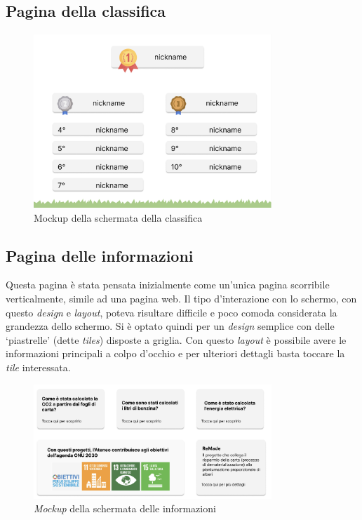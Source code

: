 \subsection{Pagina della classifica}
\begin{figure}
    \centering
    \includegraphics[width=0.8\textwidth]{img/topchartPage.png}
    \caption{Mockup della schermata della classifica}
    \label{fig:chartPage}
\end{figure}
%
\subsection{Pagina delle informazioni}
Questa pagina è stata pensata inizialmente come un'unica pagina scorribile verticalmente, simile ad una pagina web. Il tipo d'interazione con lo schermo, con questo \textit{design} e \textit{layout}, poteva risultare difficile e poco comoda considerata la grandezza dello schermo.
Si è optato quindi per un \textit{design} semplice con delle \enquote*{piastrelle} (dette \textit{tiles}) disposte a griglia. Con questo \textit{layout} è possibile avere le informazioni principali a colpo d'occhio e per ulteriori dettagli basta toccare la \textit{tile} interessata.

\begin{figure} [h]
    \centering
    \includegraphics[width=0.8\textwidth]{img/infoPage.png}
    \caption{\textit{Mockup} della schermata delle informazioni}
    \label{fig:infoPage}
\end{figure}


